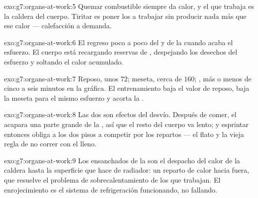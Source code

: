 \begin{solution}{exo:g7:organs-at-work:5}
Quemar combustible siempre da calor, y el  que trabaja es la
caldera del cuerpo. Tiritar es poner los  a trabajar sin
producir nada más que ese calor --- calefacción a demanda.
\end{solution}

\begin{solution}{exo:g7:organs-at-work:6}
El regreso poco a poco del  y de la  cuando acaba el
esfuerzo. El cuerpo está recargando reservas de , despejando los
desechos del esfuerzo y soltando el calor acumulado.
\end{solution}

\begin{solution}{exo:g7:organs-at-work:7}
Reposo, unos $72$; meseta, cerca de $160$; , más o menos de
cinco a seis minutos en la gráfica. El entrenamiento baja el valor de
reposo, baja la meseta para el mismo esfuerzo y acorta la .
\end{solution}

\begin{solution}{exo:g7:organs-at-work:8}
Las dos son efectos del desvío. Después de comer, el 
acapara una parte grande de la , así que el resto del cuerpo va
lento; y esprintar entonces obliga a los dos pisos a competir por los
repartos --- el flato y la vieja regla de no correr con el 
lleno.
\end{solution}

\begin{solution}{exo:g7:organs-at-work:9}
Los  ensanchados de la  son el despacho del calor de la
caldera hasta la superficie que hace de radiador: un reparto de calor
hacia fuera, que resuelve el problema de sobrecalentamiento de los
 que trabajan. El enrojecimiento es el sistema de refrigeración
funcionando, no fallando.
\end{solution}


